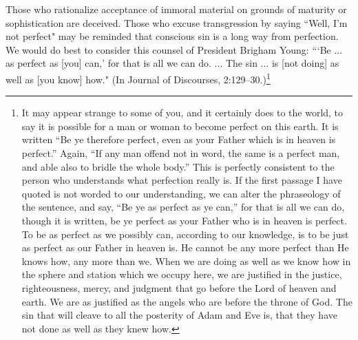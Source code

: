 Those who rationalize acceptance of immoral material on grounds of maturity or sophistication are deceived. Those who excuse transgression by saying ``Well, I'm not perfect" may be reminded that conscious sin is a long way from perfection. We would do best to consider this counsel of President Brigham Young: ```Be ... as perfect as [you] can,' for that is all we can do. ... The sin ... is [not doing] as well as [you know] how." (In Journal of Discourses, 2:129–30.)\footnote{It may appear strange to some of you, and it certainly does to the world, to say it is possible for a man or woman to become perfect on this earth. It is written “Be ye therefore perfect, even as your Father which is in heaven is perfect.” Again, “If any man offend not in word, the same is a perfect man, and able also to bridle the whole body.” This is perfectly consistent to the person who understands what perfection really is. If the first passage I have quoted is not worded to our understanding, we can alter the phraseology of the sentence, and say, “Be ye as perfect as ye can,” for that is all we can do, though it is written, be ye perfect as your Father who is in heaven is perfect. To be as perfect as we possibly can, according to our knowledge, is to be just as perfect as our Father in heaven is. He cannot be any more perfect than He knows how, any more than we. When we are doing as well as we know how in the sphere and station which we occupy here, we are justified in the justice, righteousness, mercy, and judgment that go before the Lord of heaven and earth. We are as justified as the angels who are before the throne of God. The sin that will cleave to all the posterity of Adam and Eve is, that they have not done as well as they knew how.}